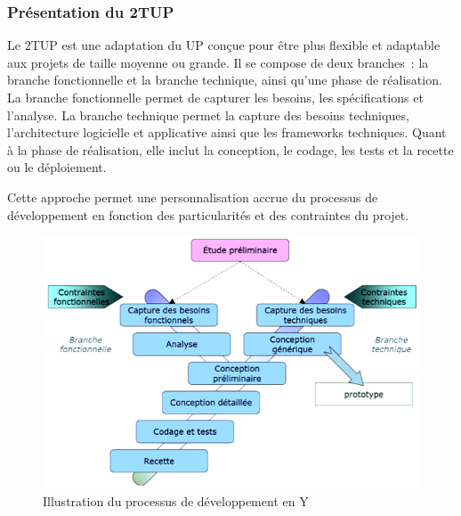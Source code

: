 \subsubsection{Présentation du 2TUP}
Le 2TUP est une adaptation du UP conçue pour être plus flexible et adaptable aux
projets de taille moyenne ou grande. Il se compose de deux branches : la branche
fonctionnelle et la branche technique, ainsi qu’une phase de réalisation.
La branche fonctionnelle permet de capturer les besoins, les spécifications et
l’analyse. La branche technique permet la capture des besoins techniques, l’architecture
logicielle et applicative ainsi que les frameworks techniques. Quant à la phase
de réalisation, elle inclut la conception, le codage, les tests et la recette
ou le déploiement.

Cette approche permet une personnalisation accrue du processus de développement en
fonction des particularités et des contraintes du projet.

\newpage
\begin{figure}[htbp]
  \includegraphics{./figure/illustrationDeveloppementEnY.png}
  \caption{Illustration du processus de développement en Y}
\end{figure}


